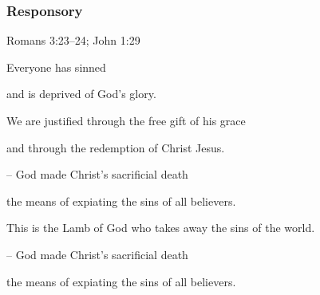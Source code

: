 \subsubsection{Responsory}

\hfill Romans 3:23--24; John 1:29

Everyone has sinned\par
and is deprived of God’s glory.\par
We are justified through the free gift of his grace\par
and through the redemption of Christ Jesus.\par
– God made Christ’s sacrificial death\par
the means of expiating the sins of all believers.\par
\vspace{5pt}
This is the Lamb of God who takes away the sins of the world.\par
– God made Christ’s sacrificial death\par
the means of expiating the sins of all believers.\par
